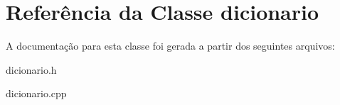 \hypertarget{classdicionario}{}\section{Referência da Classe dicionario}
\label{classdicionario}


A documentação para esta classe foi gerada a partir dos seguintes arquivos\+:\begin{DoxyCompactItemize}
\item 
dicionario.\+h\item 
dicionario.\+cpp\end{DoxyCompactItemize}
